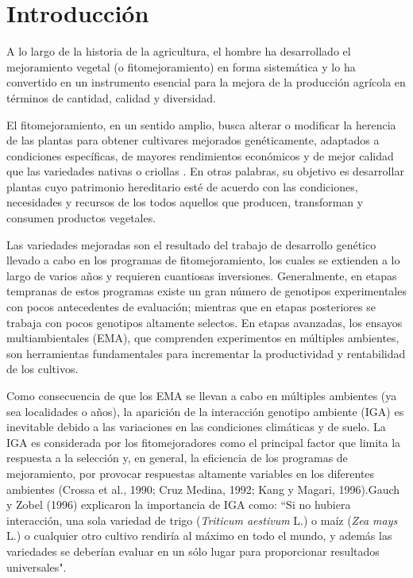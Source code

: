 

\chapter{Introducción}


A lo largo de la historia de la agricultura, el hombre ha desarrollado el mejoramiento vegetal (o fitomejoramiento) en forma sistemática y lo ha convertido en un instrumento esencial para la mejora de la producción agrícola en términos de cantidad, calidad y diversidad.  

El fitomejoramiento, en un sentido amplio, busca alterar o modificar la herencia de las plantas para obtener cultivares  mejorados genéticamente, adaptados a condiciones específicas, de mayores rendimientos económicos y de mejor calidad que las variedades nativas o criollas \citep{Allard67}. En otras palabras, su objetivo es desarrollar plantas cuyo patrimonio hereditario esté de acuerdo con las condiciones, necesidades y recursos de los todos aquellos que producen, transforman y consumen productos vegetales. 

Las variedades mejoradas son el resultado del trabajo de desarrollo genético llevado a cabo en los programas de fitomejoramiento, los cuales se extienden a lo largo de varios años y requieren cuantiosas inversiones. Generalmente, en etapas tempranas de estos programas existe un gran número de genotipos experimentales con pocos antecedentes de evaluación; mientras que en etapas posteriores  se trabaja con pocos genotipos altamente selectos. En etapas avanzadas, los ensayos multiambientales (EMA), que comprenden experimentos en múltiples ambientes, son herramientas fundamentales para incrementar la productividad y rentabilidad de los cultivos. 

Como consecuencia de que los EMA se llevan a cabo en múltiples ambientes (ya sea localidades o años), la aparición de la interacción genotipo ambiente (IGA) es inevitable debido a las variaciones en las condiciones climáticas y de suelo. La IGA es considerada por los fitomejoradores como el principal factor que limita la respuesta a la selección y, en general, la eficiencia de los programas de mejoramiento, por provocar respuestas altamente variables en los diferentes ambientes (Crossa et al., 1990; Cruz Medina, 1992; Kang y Magari, 1996).Gauch y Zobel (1996) explicaron la importancia de IGA como: “Si no hubiera interacción, una sola variedad de trigo (\emph{Triticum aestivum} L.) o maíz (\emph{Zea mays} L.) o cualquier otro cultivo rendiría al máximo en todo el mundo, y además las variedades se deberían evaluar en un sólo lugar para proporcionar resultados universales".



